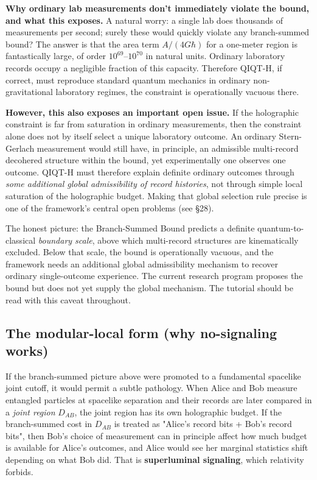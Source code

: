 \documentclass[11pt,a4paper]{article}
\begin{document}
\textbf{Why ordinary lab measurements don't immediately violate the bound, and what this exposes.} A natural worry: a single lab does thousands of measurements per second; surely these would quickly violate any branch-summed bound? The answer is that the area term $A/(4G\hbar)$ for a one-meter region is fantastically large, of order $10^{69}$–$10^{70}$ in natural units. Ordinary laboratory records occupy a negligible fraction of this capacity. Therefore QIQT-H, if correct, must reproduce standard quantum mechanics in ordinary non-gravitational laboratory regimes, the constraint is operationally vacuous there.

\textbf{However, this also exposes an important open issue.} If the holographic constraint is far from saturation in ordinary measurements, then the constraint alone does not by itself select a unique laboratory outcome. An ordinary Stern-Gerlach measurement would still have, in principle, an admissible multi-record decohered structure within the bound, yet experimentally one observes one outcome. QIQT-H must therefore explain definite ordinary outcomes through \emph{some additional global admissibility of record histories}, not through simple local saturation of the holographic budget. Making that global selection rule precise is one of the framework's central open problems (see §28).

The honest picture: the Branch-Summed Bound predicts a definite quantum-to-classical \emph{boundary scale}, above which multi-record structures are kinematically excluded. Below that scale, the bound is operationally vacuous, and the framework needs an additional global admissibility mechanism to recover ordinary single-outcome experience. The current research program proposes the bound but does not yet supply the global mechanism. The tutorial should be read with this caveat throughout.

\subsection{The modular-local form (why no-signaling works)}

If the branch-summed picture above were promoted to a fundamental spacelike joint cutoff, it would permit a subtle pathology. When Alice and Bob measure entangled particles at spacelike separation and their records are later compared in a \emph{joint region} $D_{AB}$, the joint region has its own holographic budget. If the branch-summed cost in $D_{AB}$ is treated as "Alice's record bits + Bob's record bits", then Bob's choice of measurement can in principle affect how much budget is available for Alice's outcomes, and Alice would see her marginal statistics shift depending on what Bob did. That is \textbf{superluminal signaling}, which relativity forbids.
\end{document}

